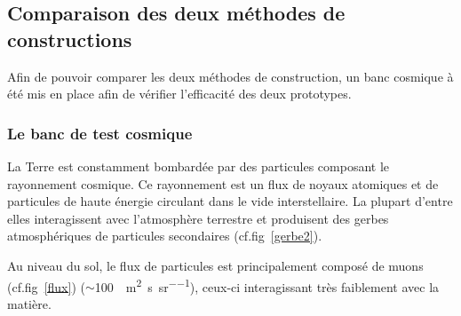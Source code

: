  \subsection{Comparaison des deux méthodes de constructions}
 
 Afin de pouvoir comparer les deux méthodes de construction, un banc cosmique à été mis en place afin de vérifier l'efficacité des deux prototypes.
 
 \subsubsection{Le banc de test cosmique}
 \label{banc}
 La Terre est constamment bombardée par des particules composant le rayonnement cosmique. Ce rayonnement est un flux de noyaux atomiques et de particules de haute énergie circulant dans le vide interstellaire. La plupart d'entre elles interagissent avec l'atmosphère terrestre et produisent des gerbes atmosphériques de particules secondaires (cf.fig~\ref{gerbe2}).
 
 Au niveau du sol, le flux de particules est principalement composé de muons (cf.fig~\ref{flux}) ($\sim$\SI{100}{\per\square\meter\per\second\per\steradian}), ceux-ci interagissant très faiblement avec la matière.
 
